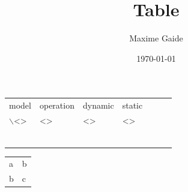 \documentclass[11pt]{article}
\author{Maxime Gaide}
\date{\today}
\title{Table}
\begin{document}
\maketitle
\tableofcontents

\begin{center}
\begin{tabular}{lllllll}
\hline
model & operation & dynamic & static &  &  & \\[0pt]
$\backslash$<> & <> & <> & <> &  &  & \\[0pt]
\hline
 &  &  &  &  &  & \\[0pt]
\hline
 &  &  &  &  &  & \\[0pt]
\hline
 &  &  &  &  &  & \\[0pt]
\hline
 &  &  &  &  &  & \\[0pt]
\hline
 &  &  &  &  &  & \\[0pt]
 &  &  &  &  &  & \\[0pt]
\hline
\end{tabular}
\end{center}

\begin{center}
\begin{tabular}{ll}
a & b\\[0pt]
b & c\\[0pt]
\end{tabular}
\end{center}
\end{document}
